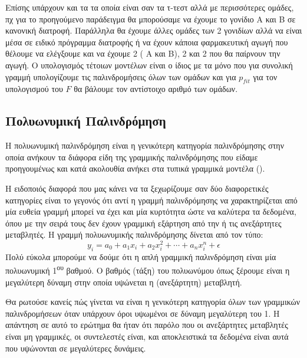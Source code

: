 Επίσης υπάρχουν και τα  τα οποία είναι σαν τα τ-τεστ αλλά με περισσότερες ομάδες, πχ για το προηγούμενο
παράδειγμα θα μπορούσαμε να έχουμε το γονίδιο Α και Β σε κανονική διατροφή. Παράλληλα θα έχουμε άλλες ομάδες
των 2 γονιδίων αλλά να είναι μέσα σε ειδικό πρόγραμμα διατροφής ή να έχουν κάποια
φαρμακευτική αγωγή που θέλουμε να ελέγξουμε και να έχουμε 2 ( A και B), 2
 και 2 που θα παίρνουν την αγωγή. Ο υπολογισμός τέτοιων μοντέλων είναι ο ίδιος με
τα  μόνο που για συνολική γραμμή υπολογίζουμε τις παλινδρομήσεις όλων των ομάδων
και για $p_{fit}$ για τον υπολογισμού του $F$ θα βάλουμε τον αντίστοιχο αριθμό των ομάδων.
\subsection{Πολυωνυμική Παλινδρόμηση}
Η πολυωνυμική παλινδρόμηση είναι η γενικότερη κατηγορία παλινδρόμησης στην οποία
ανήκουν τα διάφορα είδη της γραμμικής παλινδρόμησης που είδαμε προηγουμένως και κατά
ακολουθία ανήκει στα τυπικά γραμμικά μοντέλα ().

Η ειδοποιός
διαφορά που μας κάνει να τα ξεχωρίζουμε σαν δύο διαφορετικές κατηγορίες είναι το γεγονός
ότι αντί η γραμμή παλινδρόμησης να χαρακτηρίζεται από μία ευθεία γραμμή μπορεί να έχει
και μία κυρτότητα ώστε να  καλύτερα τα δεδομένα, όπου με την σειρά τους δεν
έχουν γραμμική εξάρτηση από την ή τις ανεξάρτητες μεταβλητές. Η γραμμή πολυωνυμικής
παλινδρόμησης δίνεται από τον τύπο:
$$y_i=a_0+a_1x_i+a_2x_i^2+\cdots +a_nx_i^n+\epsilon$$
Πολύ εύκολα μπορούμε να δούμε ότι η απλή γραμμική παλινδρόμηση είναι μία πολυωνυμική
1\textsuperscript{ου} βαθμού. Ο βαθμός (τάξη) του πολυωνύμου όπως ξέρουμε είναι η μεγαλύτερη δύναμη
στην οποία υψώνεται η (ανεξάρτητη) μεταβλητή.

Θα ρωτούσε κανείς πώς γίνεται να είναι η
γενικότερη κατηγορία όλων των γραμμικών παλινδρομήσεων όταν υπάρχουν όροι υψωμένοι
σε δύναμη μεγαλύτερη του 1. Η απάντηση σε αυτό το ερώτημα θα ήταν ότι παρόλο που οι
ανεξάρτητες μεταβλητές είναι μη γραμμικές, οι συντελεστές είναι, και αποκλειστικά
τα δεδομένα είναι αυτά που υψώνονται σε μεγαλύτερες δυνάμεις.

